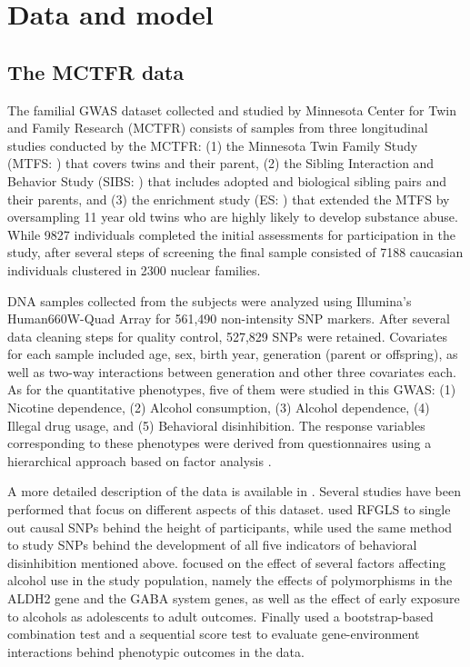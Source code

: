 \section{Data and model}
\label{sec:modelSection}

\subsection{The MCTFR data}
The familial GWAS dataset collected and studied by Minnesota Center for Twin and Family Research (MCTFR)\citep{LiEtal11, MillerEtal12, McGueEtal13} consists of samples from three longitudinal studies conducted by the MCTFR: (1) the Minnesota Twin Family Study (MTFS: \cite{IaconoEtal99}) that covers twins and their parent, (2) the Sibling Interaction and Behavior Study (SIBS: \cite{McGueEtal07}) that includes adopted and biological sibling pairs and their parents, and (3) the enrichment study (ES: \cite{KeyesEtal09}) that extended the MTFS by oversampling 11 year old twins who are highly likely to develop substance abuse. While 9827 individuals completed the initial assessments for participation in the study, after several steps of screening the final sample consisted of 7188 caucasian individuals clustered in 2300 nuclear families. %

DNA samples collected from the subjects were analyzed using Illumina’s Human660W-Quad Array for 561,490 non-intensity SNP markers. After several data cleaning steps for quality control, 527,829 SNPs were retained. Covariates for each sample included age, sex, birth year, generation (parent or offspring), as well as two-way interactions between generation and other three covariates each. As for the quantitative phenotypes, five of them were studied in this GWAS: (1) Nicotine dependence, (2) Alcohol consumption, (3) Alcohol dependence, (4) Illegal drug usage, and (5) Behavioral disinhibition. The response variables corresponding to these phenotypes were derived from questionnaires using a hierarchical approach based on factor analysis \citep{HicksEtal11}.

\vspace{1em}
A more detailed description of the data is available  in \cite{MillerEtal12}. Several studies have been performed that focus on different aspects of this dataset. \cite{LiEtal11} used RFGLS to single out causal SNPs behind the height of participants, while \cite{McGueEtal13} used the same method to study SNPs behind the development of all five indicators of behavioral disinhibition mentioned above. \cite{IronsThesis12} focused on the effect of several factors affecting alcohol use in the study population, namely the effects of polymorphisms in the ALDH2 gene and the GABA system genes, as well as the effect of early exposure to alcohols as adolescents to adult outcomes. Finally \cite{CoombesThesis16} used a bootstrap-based combination test and a sequential score test to evaluate gene-environment interactions behind phenotypic outcomes in the data.

